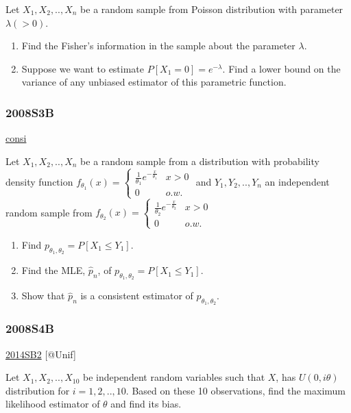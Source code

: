 \documentclass[10pt,twocolumn,portrait]{article}
\begin{document}
Let \(X_1,X_2,..,X_{n}\) be a random sample from Poisson distribution
with parameter \(\lambda(>0)\).

\begin{enumerate}
\def\labelenumi{(\alph{enumi})}
\item
  Find the Fisher's information in the sample about the parameter
  \(\lambda\).
\item
  Suppose we want to estimate \(P[X_1=0]=e^{-\lambda}\). Find a lower
  bound on the variance of any unbiased estimator of this parametric
  function.
\end{enumerate}

\hypertarget{s3b}{%
\subsubsection{2008S3B}\label{s3b}}

\protect\hyperlink{section-8}{consi}

Let \(X_1,X_2,..,X_{n}\) be a random sample from a distribution with
probability density function
\(f_{\theta_1}(x)=\begin{cases}\frac1{\theta_1} e^{-\frac{x}{\theta_1}}& x>0\\0& o.w.\end{cases}\)
and \(Y_1,Y_2,..,Y_{n}\) an independent random sample from
\(f_{\theta_2}(x)=\begin{cases}\frac1{\theta_2} e^{-\frac{x}{\theta_2}}& x>0\\0& o.w.\end{cases}\)

\begin{enumerate}
\def\labelenumi{(\alph{enumi})}
\item
  Find \(p_{\theta_1,\theta_2}= P[X_1\le Y_1]\).
\item
  Find the MLE, \(\hat p_n\), of
  \(p_{\theta_1,\theta_2}= P[X_1\le Y_1]\).
\item
  Show that \(\hat p_n\) is a consistent estimator of
  \(p_{\theta_1,\theta_2}\).
\end{enumerate}

\hypertarget{s4b}{%
\subsubsection{2008S4B}\label{s4b}}

\protect\hyperlink{sb2-2}{2014SB2} {[}@Unif{]}

Let \(X_1,X_2,..,X_{10}\) be independent random variables such that
\(X\), has \(U(0,i\theta)\) distribution for \(i= 1,2,..,10\). Based on
these 10 observations, find the maximum likelihood estimator of
\(\theta\) and find its bias.
\end{document}
